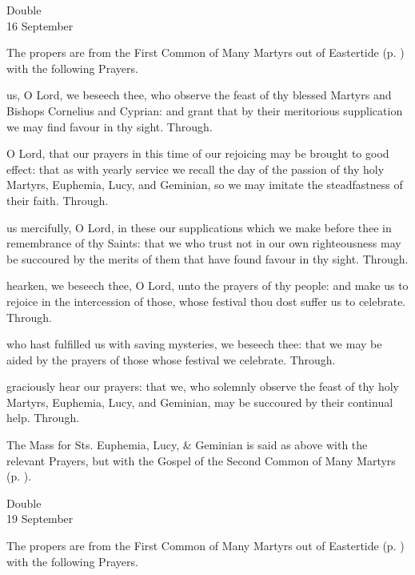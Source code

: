 \begin{inhead}
	{Double\\
		16 September}
\end{inhead}

\begin{rubric}
	The propers are from the First Common of Many Martyrs out of Eastertide (p. \pageref{CommonMartyrsI}) with the following Prayers.
\end{rubric}

\collect
{} us, O Lord, we beseech thee, who observe the feast of thy blessed Martyrs and Bishops Cornelius and Cyprian: and grant that by their meritorious supplication we may find favour in thy sight. Through.

 O Lord, that our prayers in this time of our rejoicing may be brought to good effect: that as with yearly service we recall the day of the passion of thy holy Martyrs, Euphemia, Lucy, and Geminian, so we may imitate the steadfastness of their faith. Through.

\secret
{} us mercifully, O Lord, in these our supplications which we make before thee in remembrance of thy Saints: that we who trust not in our own righteousness may be succoured by the merits of them that have found favour in thy sight. Through.

 hearken, we beseech thee, O Lord, unto the prayers of thy people: and make us to rejoice in the intercession of those, whose festival thou dost suffer us to celebrate. Through.

\postcommunion
{} who hast fulfilled us with saving mysteries, we beseech thee: that we may be aided by the prayers of those whose festival we celebrate. Through.

 graciously hear our prayers: that we, who solemnly observe the feast of thy holy Martyrs, Euphemia, Lucy, and Geminian, may be succoured by their continual help. Through.

\begin{rubric}
	The Mass for Sts. Euphemia, Lucy, \& Geminian is said as above with the relevant Prayers, but with the Gospel of the Second Common of Many Martyrs (p. \pageref{CommonMartyrsII}).
\end{rubric}

\begin{inhead}
	{Double\\
		19 September}
\end{inhead}
\begin{rubric}
	The propers are from the First Common of Many Martyrs out of Eastertide (p. \pageref{CommonMartyrsI}) with the following Prayers.
\end{rubric}



